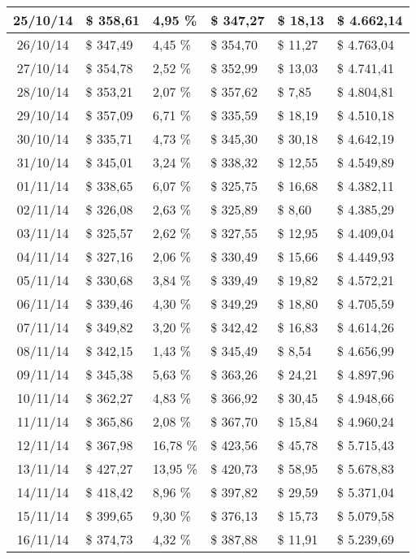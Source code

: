 \begin{small}
\begin{longtable}{|c|l|l|l|l|l|}
25/10/14 & \$ 358,61 & 4,95 \% & \$ 347,27 & \$ 18,13 & \$ 4.662,14 \\ \hline
26/10/14 & \$ 347,49 & 4,45 \% & \$ 354,70 & \$ 11,27 & \$ 4.763,04 \\ \hline
27/10/14 & \$ 354,78 & 2,52 \% & \$ 352,99 & \$ 13,03 & \$ 4.741,41 \\ \hline
28/10/14 & \$ 353,21 & 2,07 \% & \$ 357,62 & \$ 7,85 & \$ 4.804,81 \\ \hline
29/10/14 & \$ 357,09 & 6,71 \% & \$ 335,59 & \$ 18,19 & \$ 4.510,18 \\ \hline
30/10/14 & \$ 335,71 & 4,73 \% & \$ 345,30 & \$ 30,18 & \$ 4.642,19 \\ \hline
31/10/14 & \$ 345,01 & 3,24 \% & \$ 338,32 & \$ 12,55 & \$ 4.549,89 \\ \hline
01/11/14 & \$ 338,65 & 6,07 \% & \$ 325,75 & \$ 16,68 & \$ 4.382,11 \\ \hline
02/11/14 & \$ 326,08 & 2,63 \% & \$ 325,89 & \$ 8,60 & \$ 4.385,29 \\ \hline
03/11/14 & \$ 325,57 & 2,62 \% & \$ 327,55 & \$ 12,95 & \$ 4.409,04 \\ \hline
04/11/14 & \$ 327,16 & 2,06 \% & \$ 330,49 & \$ 15,66 & \$ 4.449,93 \\ \hline
05/11/14 & \$ 330,68 & 3,84 \% & \$ 339,49 & \$ 19,82 & \$ 4.572,21 \\ \hline
06/11/14 & \$ 339,46 & 4,30 \% & \$ 349,29 & \$ 18,80 & \$ 4.705,59 \\ \hline
07/11/14 & \$ 349,82 & 3,20 \% & \$ 342,42 & \$ 16,83 & \$ 4.614,26 \\ \hline
08/11/14 & \$ 342,15 & 1,43 \% & \$ 345,49 & \$ 8,54 & \$ 4.656,99 \\ \hline
09/11/14 & \$ 345,38 & 5,63 \% & \$ 363,26 & \$ 24,21 & \$ 4.897,96 \\ \hline
10/11/14 & \$ 362,27 & 4,83 \% & \$ 366,92 & \$ 30,45 & \$ 4.948,66 \\ \hline
11/11/14 & \$ 365,86 & 2,08 \% & \$ 367,70 & \$ 15,84 & \$ 4.960,24 \\ \hline
12/11/14 & \$ 367,98 & 16,78 \% & \$ 423,56 & \$ 45,78 & \$ 5.715,43 \\ \hline
13/11/14 & \$ 427,27 & 13,95 \% & \$ 420,73 & \$ 58,95 & \$ 5.678,83 \\ \hline
14/11/14 & \$ 418,42 & 8,96 \% & \$ 397,82 & \$ 29,59 & \$ 5.371,04 \\ \hline
15/11/14 & \$ 399,65 & 9,30 \% & \$ 376,13 & \$ 15,73 & \$ 5.079,58 \\ \hline
16/11/14 & \$ 374,73 & 4,32 \% & \$ 387,88 & \$ 11,91 & \$ 5.239,69 \\ \hline

\end{longtable}
\end{small}
